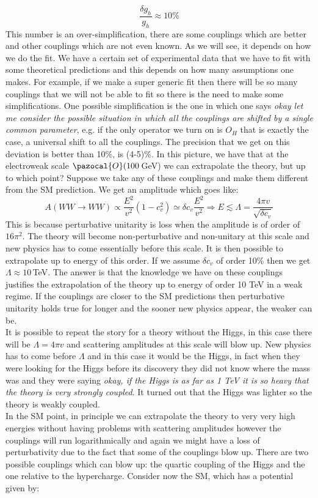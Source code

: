 \documentclass[../main.tex]{subfiles}
\begin{document}
\[
\frac{\delta g_h}{g_h}\approx10\%
\]
This number is an over-simplification, there are some couplings which are better and other couplings which are not even known. As we will see, it depends on how we do the fit. We have a certain set of experimental data that we have to fit with some theoretical predictions and this depends on how many assumptions one makes. For example, if we make a super generic fit then there will be so many couplings that we will not be able to fit so there is the need to make some simplifications. One possible simplification is the one in which one says \textit{okay let me consider the possible situation in which all the couplings are shifted by a single common parameter}, e.g. if the only operator we turn on is $O_H$ that is exactly the case, a universal shift to all the couplings. The precision that we get on this deviation is better than 10\%, is (4-5)\%. In this picture, we have that at the electroweak scale $\pazocal{O}(100$\,GeV) we can extrapolate the theory, but up to which point? Suppose we take any of these couplings and make them different from the SM prediction. We get an amplitude which goes like:
\[
A(WW\to WW)\propto\frac{E^2}{v^2}(1-c_v^2)\simeq\delta c_v\frac{E^2}{v^2}\Rightarrow E\lesssim\Lambda=\frac{4\pi v}{\sqrt{\delta c_v}}
\]
This is because perturbative unitarity is loss when the amplitude is of order of $16\pi^2$. The theory will become non-perturbative and non-unitary at this scale and new physics has to come essentially before this scale. It is then possible to extrapolate up to energy of this order. If we assume $\delta c_v$ of order 10\% then we get $\Lambda\approx10$\,TeV. The answer is that the knowledge we have on these couplings justifies the extrapolation of the theory up to energy of order 10 TeV in a weak regime. If the couplings are closer to the SM predictions then perturbative unitarity holds true for longer and the sooner new physics appear, the weaker can be.\\
It is possible to repeat the story for a theory without the Higgs, in this case there will be $\Lambda=4\pi v$ and scattering amplitudes at this scale will blow up. New physics has to come before $\Lambda$ and in this case it would be the Higgs, in fact when they were looking for the Higgs before its discovery they did not know where the mass was and they were saying \textit{okay, if the Higgs is as far as 1 TeV it is so heavy that the theory is very strongly coupled}. It turned out that the Higgs was lighter so the theory is weakly coupled.\\
In the SM point, in principle we can extrapolate the theory to very very high energies without having problems with scattering amplitudes however the couplings will run logarithmically and again we might have a loss of perturbativity due to the fact that some of the couplings blow up. There are two possible couplings which can blow up: the quartic coupling of the Higgs and the one relative to the hypercharge.  Consider now the SM, which has a potential given by:
\end{document}
